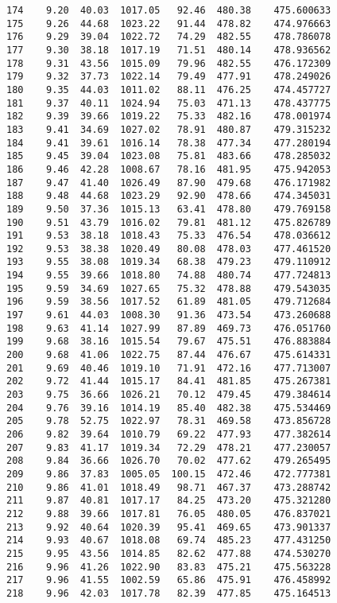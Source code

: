 \documentclass[11pt]{article}
\begin{document}
\begin{tcolorbox}[breakable, size=fbox, boxrule=.5pt, pad at break*=1mm, opacityfill=0]
\begin{Verbatim}[commandchars=\\\{\}]
174    9.20  40.03  1017.05   92.46  480.38    475.600633
175    9.26  44.68  1023.22   91.44  478.82    474.976663
176    9.29  39.04  1022.72   74.29  482.55    478.786078
177    9.30  38.18  1017.19   71.51  480.14    478.936562
178    9.31  43.56  1015.09   79.96  482.55    476.172309
179    9.32  37.73  1022.14   79.49  477.91    478.249026
180    9.35  44.03  1011.02   88.11  476.25    474.457727
181    9.37  40.11  1024.94   75.03  471.13    478.437775
182    9.39  39.66  1019.22   75.33  482.16    478.001974
183    9.41  34.69  1027.02   78.91  480.87    479.315232
184    9.41  39.61  1016.14   78.38  477.34    477.280194
185    9.45  39.04  1023.08   75.81  483.66    478.285032
186    9.46  42.28  1008.67   78.16  481.95    475.942053
187    9.47  41.40  1026.49   87.90  479.68    476.171982
188    9.48  44.68  1023.29   92.90  478.66    474.345031
189    9.50  37.36  1015.13   63.41  478.80    479.769158
190    9.51  43.79  1016.02   79.81  481.12    475.826789
191    9.53  38.18  1018.43   75.33  476.54    478.036612
192    9.53  38.38  1020.49   80.08  478.03    477.461520
193    9.55  38.08  1019.34   68.38  479.23    479.110912
194    9.55  39.66  1018.80   74.88  480.74    477.724813
195    9.59  34.69  1027.65   75.32  478.88    479.543035
196    9.59  38.56  1017.52   61.89  481.05    479.712684
197    9.61  44.03  1008.30   91.36  473.54    473.260688
198    9.63  41.14  1027.99   87.89  469.73    476.051760
199    9.68  38.16  1015.54   79.67  475.51    476.883884
200    9.68  41.06  1022.75   87.44  476.67    475.614331
201    9.69  40.46  1019.10   71.91  472.16    477.713007
202    9.72  41.44  1015.17   84.41  481.85    475.267381
203    9.75  36.66  1026.21   70.12  479.45    479.384614
204    9.76  39.16  1014.19   85.40  482.38    475.534469
205    9.78  52.75  1022.97   78.31  469.58    473.856728
206    9.82  39.64  1010.79   69.22  477.93    477.382614
207    9.83  41.17  1019.34   72.29  478.21    477.230057
208    9.84  36.66  1026.70   70.02  477.62    479.265495
209    9.86  37.83  1005.05  100.15  472.46    472.777381
210    9.86  41.01  1018.49   98.71  467.37    473.288742
211    9.87  40.81  1017.17   84.25  473.20    475.321280
212    9.88  39.66  1017.81   76.05  480.05    476.837021
213    9.92  40.64  1020.39   95.41  469.65    473.901337
214    9.93  40.67  1018.08   69.74  485.23    477.431250
215    9.95  43.56  1014.85   82.62  477.88    474.530270
216    9.96  41.26  1022.90   83.83  475.21    475.563228
217    9.96  41.55  1002.59   65.86  475.91    476.458992
218    9.96  42.03  1017.78   82.39  477.85    475.164513

\end{Verbatim}
\end{tcolorbox}
\end{document}
